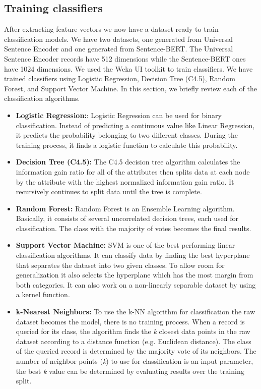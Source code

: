 \documentclass[conference]{IEEEtran}
\begin{document}
\subsection{Training classifiers}
After extracting feature vectors we now have a dataset ready to train classification models. We have two datasets,
one generated from Universal Sentence Encoder and one generated from Sentence-BERT. The Universal Sentence Encoder
records have 512 dimensions while the Sentence-BERT ones have 1024 dimensions. We used the Weka UI toolkit 
\cite{10.1145/1656274.1656278} to train classifiers. We have trained classifiers using Logistic Regression, 
Decision Tree (C4.5), Random Forest, and Support Vector Machine. In this section, we briefly review each of the 
classification algorithms.
\begin{itemize}
  \item\textbf{Logistic Regression:}: Logistic Regression can be used for binary classification. Instead of 
  predicting a continuous value like Linear Regression, it predicts the probability belonging to two different 
  classes. During the training process, it finds a logistic function to calculate this probability.
  \item\textbf{Decision Tree (C4.5):} The C4.5 decision tree algorithm calculates the information gain ratio 
  for all of the attributes then splits data at each node by the attribute with the highest normalized 
  information gain ratio. It recursively continues to split data until the tree is complete.
  \item\textbf{Random Forest:} Random Forest is an Ensemble Learning algorithm. Basically, it consists of several 
  uncorrelated decision trees, each used for classification. The class with the majority of votes becomes 
  the final results.
  \item\textbf{Support Vector Machine:} SVM is one of the best performing linear classification algorithms. It can 
  classify data by finding the best hyperplane that separates the dataset into two given classes. To allow 
  room for generalization it also selects the hyperplane which has the most margin from both categories. It can 
  also work on a non-linearly separable dataset by using a kernel function.
  \item\textbf{k-Nearest Neighbors:} To use the k-NN algorithm for classification the raw dataset becomes the model,
  there is no training process. When a record is queried for its class, the algorithm finds the \textit{k} closest 
  data points in the raw dataset according to a distance function (e.g. Euclidean distance). The class of 
  the queried record is determined by the majority vote of its neighbors. The number of neighbor 
  points (\textit{k}) to use for classification is an input parameter, the best \textit{k} value can be 
  determined by evaluating results over the training split.
\end{itemize}
\end{document}
